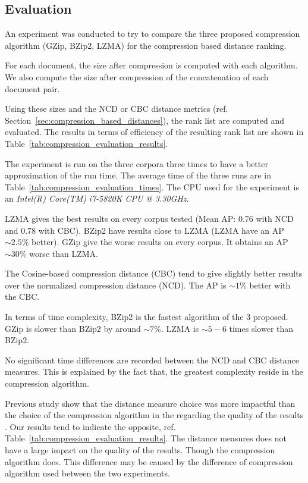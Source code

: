 \subsection{Evaluation}

An experiment was conducted to try to compare the three proposed compression algorithm (GZip, BZip2, LZMA) for the compression based distance ranking.

For each document, the size after compression is computed with each algorithm.
We also compute the size after compression of the concatenation of each document pair.

Using these sizes and the NCD or CBC distance metrics (ref. Section~\ref{sec:compression_based_distances}), the rank list are computed and evaluated.
The results in terms of efficiency of the resulting rank list are shown in Table~\ref{tab:compression_evaluation_results}.

The experiment is run on the three corpora three times to have a better approximation of the run time.
The average time of the three runs are in Table~\ref{tab:compression_evaluation_times}.
The CPU used for the experiment is an \textit{Intel(R) Core(TM)} \textit{i7-5820K CPU} \textit{@ 3.30GHz}.

LZMA gives the best results on every corpus tested (Mean AP: 0.76 with NCD and 0.78 with CBC).
BZip2 have results close to LZMA (LZMA have an AP $\sim 2.5\%$ better).
GZip give the worse results on every corpus.
It obtains an AP $\sim 30\%$ worse than LZMA.

The Cosine-based compression distance (CBC) tend to give slightly better results over the normalized compression distance (NCD).
The AP is $\sim 1\%$ better with the CBC.

In terms of time complexity, BZip2 is the fastest algorithm of the 3 proposed.
GZip is slower than BZip2 by around $\sim 7\%$.
LZMA is $\sim 5-6$ times slower than BZip2.

No significant time differences are recorded between the NCD and CBC distance measures.
This is explained by the fact that, the greatest complexity reside in the compression algorithm.

Previous study show that the distance measure choice was more impactful than the choice of the compression algorithm in the regarding the quality of the results \cite{comparing_compression}.
Our results tend to indicate the opposite, ref. Table~\ref{tab:compression_evaluation_results}.
The distance measures does not have a large impact on the quality of the results.
Though the compression algorithm does.
This difference may be caused by the difference of compression algorithm used between the two experiments.

